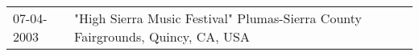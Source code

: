 \begin{supertabular}{ll}
 07-04-2003 &  "High Sierra Music Festival" Plumas-Sierra County Fairgrounds, Quincy, CA, USA \\
\end{supertabular}
